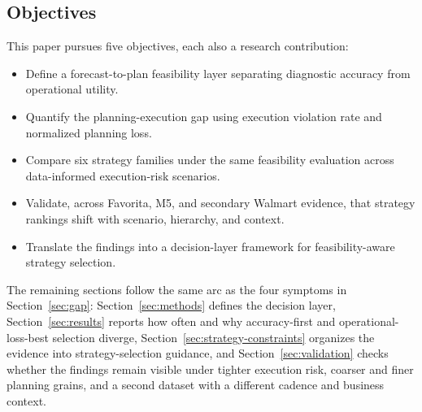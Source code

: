 \subsection{Objectives}

This paper pursues five objectives, each also a research contribution:
\begin{itemize}
\setlength{\itemsep}{0pt}
\setlength{\parsep}{0pt}
\setlength{\parskip}{0pt}
\item Define a forecast-to-plan feasibility layer separating diagnostic accuracy from operational utility.
\item Quantify the planning-execution gap using execution violation rate and normalized planning loss.
\item Compare six strategy families under the same feasibility evaluation across data-informed execution-risk scenarios.
\item Validate, across Favorita, M5, and secondary Walmart evidence, that strategy rankings shift with scenario, hierarchy, and context.
\item Translate the findings into a decision-layer framework for feasibility-aware strategy selection.
\end{itemize}

The remaining sections follow the same arc as the four symptoms in Section~\ref{sec:gap}: Section~\ref{sec:methods} defines the decision layer, Section~\ref{sec:results} reports how often and why accuracy-first and operational-loss-best selection diverge, Section~\ref{sec:strategy-constraints} organizes the evidence into strategy-selection guidance, and Section~\ref{sec:validation} checks whether the findings remain visible under tighter execution risk, coarser and finer planning grains, and a second dataset with a different cadence and business context.
